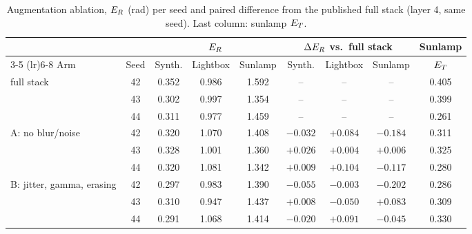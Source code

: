 \begin{table}[ht]
  \caption{Augmentation ablation, $E_{R}$ (rad) per seed and paired difference from the published full stack (layer 4, same seed). Last column: sunlamp $E_{T}$.}
  \label{tab:ablation}
  \centering
  \small
  \setlength{\tabcolsep}{3pt}
  \begin{tabular}{l c ccc ccc c}
    \toprule
    & & \multicolumn{3}{c}{$E_{R}$} & \multicolumn{3}{c}{$\Delta E_{R}$ vs.\ full stack} & Sunlamp \\
    \cmidrule(lr){3-5} \cmidrule(lr){6-8}
    Arm & Seed & Synth. & Lightbox & Sunlamp & Synth. & Lightbox & Sunlamp & $E_{T}$ \\
    \midrule
    full stack & 42 & 0.352 & 0.986 & 1.592 & -- & -- & -- & 0.405 \\
     & 43 & 0.302 & 0.997 & 1.354 & -- & -- & -- & 0.399 \\
     & 44 & 0.311 & 0.977 & 1.459 & -- & -- & -- & 0.261 \\
    \midrule
    A: no blur/noise & 42 & 0.320 & 1.070 & 1.408 & $-0.032$ & $+0.084$ & $-0.184$ & 0.311 \\
     & 43 & 0.328 & 1.001 & 1.360 & $+0.026$ & $+0.004$ & $+0.006$ & 0.325 \\
     & 44 & 0.320 & 1.081 & 1.342 & $+0.009$ & $+0.104$ & $-0.117$ & 0.280 \\
    \midrule
    B: jitter, gamma, erasing & 42 & 0.297 & 0.983 & 1.390 & $-0.055$ & $-0.003$ & $-0.202$ & 0.286 \\
     & 43 & 0.310 & 0.947 & 1.437 & $+0.008$ & $-0.050$ & $+0.083$ & 0.309 \\
     & 44 & 0.291 & 1.068 & 1.414 & $-0.020$ & $+0.091$ & $-0.045$ & 0.330 \\
    \bottomrule
  \end{tabular}
\end{table}
